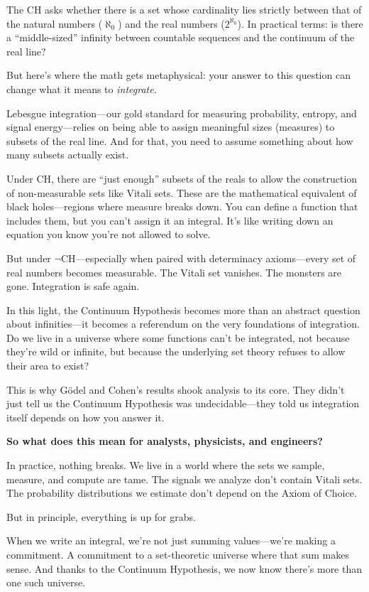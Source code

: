The CH asks whether there is a set whose cardinality lies strictly between that of the natural numbers (\( \aleph_0 \)) and the real numbers (\( 2^{\aleph_0} \)). In practical terms: is there a “middle-sized” infinity between countable sequences and the continuum of the real line?

But here’s where the math gets metaphysical: your answer to this question can change what it means to \emph{integrate}.

Lebesgue integration—our gold standard for measuring probability, entropy, and signal energy—relies on being able to assign meaningful sizes (measures) to subsets of the real line. And for that, you need to assume something about how many subsets actually exist.

Under CH, there are “just enough” subsets of the reals to allow the construction of non-measurable sets like Vitali sets. These are the mathematical equivalent of black holes—regions where measure breaks down. You can define a function that includes them, but you can’t assign it an integral. It’s like writing down an equation you know you’re not allowed to solve.

But under \( \neg \)CH—especially when paired with determinacy axioms—every set of real numbers becomes measurable. The Vitali set vanishes. The monsters are gone. Integration is safe again.

In this light, the Continuum Hypothesis becomes more than an abstract question about infinities—it becomes a referendum on the very foundations of integration. Do we live in a universe where some functions can’t be integrated, not because they’re wild or infinite, but because the underlying set theory refuses to allow their area to exist?

This is why Gödel and Cohen’s results shook analysis to its core. They didn’t just tell us the Continuum Hypothesis was undecidable—they told us integration itself depends on how you answer it.

\vspace{1em}
\textbf{So what does this mean for analysts, physicists, and engineers?}

In practice, nothing breaks. We live in a world where the sets we sample, measure, and compute are tame. The signals we analyze don’t contain Vitali sets. The probability distributions we estimate don’t depend on the Axiom of Choice.

But in principle, everything is up for grabs.

When we write an integral, we’re not just summing values—we’re making a commitment. A commitment to a set-theoretic universe where that sum makes sense. And thanks to the Continuum Hypothesis, we now know there’s more than one such universe.

